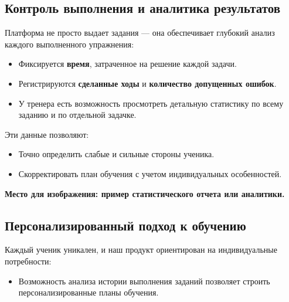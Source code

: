 \documentclass[a4paper,12pt]{article}
\begin{document}
\subsection{Контроль выполнения и аналитика результатов}

Платформа не просто выдает задания --- она обеспечивает глубокий анализ каждого выполненного упражнения:
\begin{itemize}
    \item Фиксируется \textbf{время}, затраченное на решение каждой задачи.
    \item Регистрируются \textbf{сделанные ходы} и \textbf{количество допущенных ошибок}.
    \item У тренера есть возможность просмотреть детальную статистику по всему заданию и по отдельной задачке.
\end{itemize}
Эти данные позволяют:
\begin{itemize}
    \item Точно определить слабые и сильные стороны ученика.
    \item Скорректировать план обучения с учетом индивидуальных особенностей.
\end{itemize}

\vspace{0.5cm}
\noindent
\textbf{Место для изображения: пример статистического отчета или аналитики.}
\begin{center}
\end{center}
\vspace{0.5cm}

\subsection{Персонализированный подход к обучению}
Каждый ученик уникален, и наш продукт ориентирован на индивидуальные потребности:
\begin{itemize}
    \item Возможность анализа истории выполнения заданий позволяет строить персонализированные планы обучения.
\end{itemize}
\end{document}
